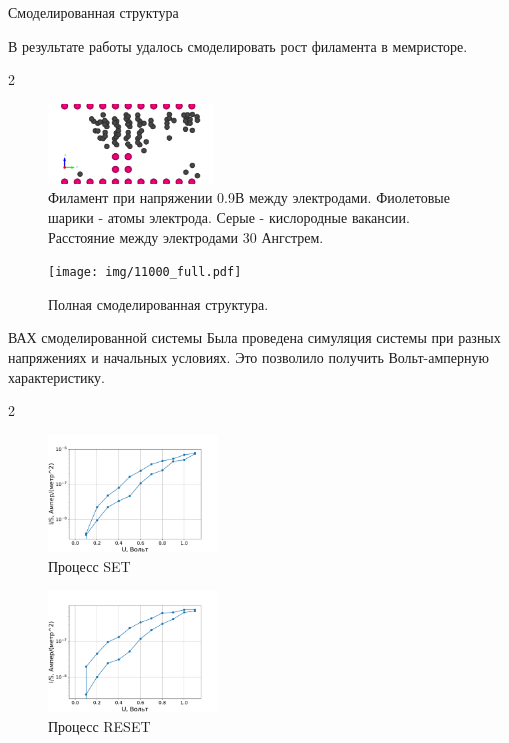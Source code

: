 \documentclass{beamer}%
\begin{document}
\begin{frame}{Смоделированная структура}{}

В результате работы удалось смоделировать рост филамента в мемристоре.

\begin {multicols} {2}
\begin{figure}
    \centering
    \includegraphics[height=80px]{img/11000.pdf}
    \caption{Филамент при напряжении 0.9В между электродами.
    Фиолетовые шарики - атомы электрода.
    Серые - кислородные вакансии.
    Расстояние между электродами 30 Ангстрем.
    }
\end{figure}
\columnbreak
\begin{figure}
    \centering
    \texttt{[image: img/11000\_full.pdf]}
    \caption{Полная смоделированная структура.
    }
\end{figure}
\end{multicols}
\end{frame}

\begin{frame}{ВАХ смоделированной системы}
    Была проведена симуляция системы при разных напряжениях и начальных условиях.
    Это позволило получить Вольт-амперную характеристику.
    \begin {multicols}{2}
        \begin{figure}
            \centering
            \includegraphics[width=170px]{img/SET.pdf}
            \caption {Процесс SET}
        \end{figure}
        \columnbreak
        \begin{figure}
            \centering
            \includegraphics[width=170px]{img/RESET.pdf}
            \caption {Процесс RESET}
        \end{figure}   
    \end{multicols}

\end{frame}
\end{document}
